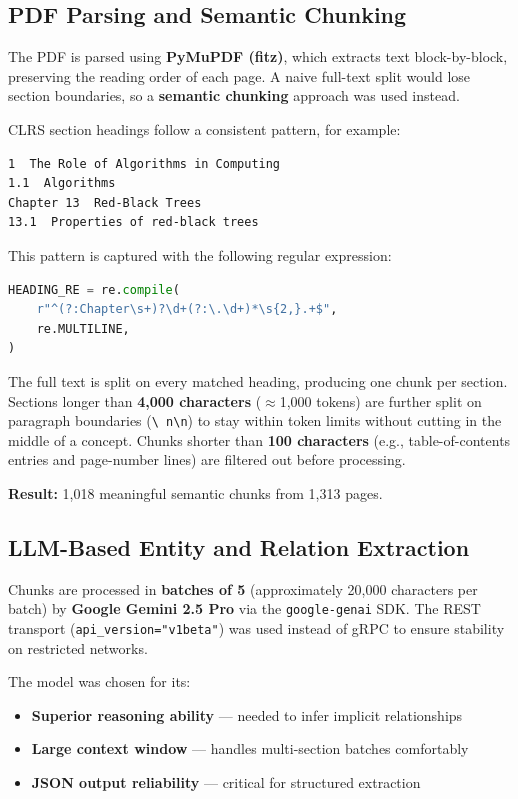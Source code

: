 \documentclass[12pt,a4paper]{article}
\begin{document}
\subsection{PDF Parsing and Semantic Chunking}

The PDF is parsed using \textbf{PyMuPDF (fitz)}, which extracts text
block-by-block, preserving the reading order of each page. A naive full-text
split would lose section boundaries, so a \textbf{semantic chunking} approach
was used instead.

CLRS section headings follow a consistent pattern, for example:

\begin{lstlisting}
1  The Role of Algorithms in Computing
1.1  Algorithms
Chapter 13  Red-Black Trees
13.1  Properties of red-black trees
\end{lstlisting}

This pattern is captured with the following regular expression:

\begin{lstlisting}[language=Python]
HEADING_RE = re.compile(
    r"^(?:Chapter\s+)?\d+(?:\.\d+)*\s{2,}.+$",
    re.MULTILINE,
)
\end{lstlisting}

The full text is split on every matched heading, producing one chunk per
section. Sections longer than \textbf{4,000 characters} ($\approx$1,000 tokens)
are further split on paragraph boundaries (\texttt{\textbackslash
n\textbackslash n}) to stay within token limits without cutting in the middle of
a concept. Chunks shorter than \textbf{100 characters} (e.g.,
table-of-contents entries and page-number lines) are filtered out before
processing.

\textbf{Result:} 1,018 meaningful semantic chunks from 1,313 pages.

\subsection{LLM-Based Entity and Relation Extraction}

Chunks are processed in \textbf{batches of 5} (approximately 20,000 characters
per batch) by \textbf{Google Gemini 2.5 Pro} via the \texttt{google-genai} SDK.
The REST transport (\texttt{api\_version="v1beta"}) was used instead of gRPC to
ensure stability on restricted networks.

The model was chosen for its:
\begin{itemize}
  \item \textbf{Superior reasoning ability} --- needed to infer implicit
    relationships
  \item \textbf{Large context window} --- handles multi-section batches
    comfortably
  \item \textbf{JSON output reliability} --- critical for structured extraction
\end{itemize}
\end{document}
